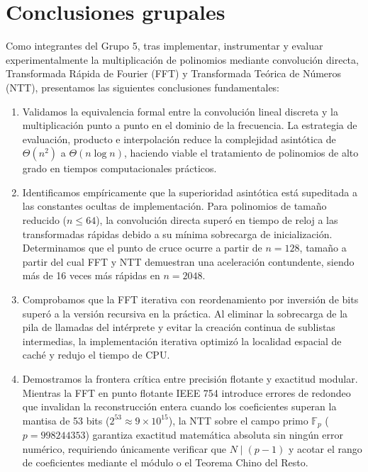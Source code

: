 \section{Conclusiones grupales}

Como integrantes del Grupo 5, tras implementar, instrumentar y evaluar experimentalmente la multiplicación de polinomios mediante convolución directa, Transformada Rápida de Fourier (FFT) y Transformada Teórica de Números (NTT), presentamos las siguientes conclusiones fundamentales:

\begin{enumerate}
    \item Validamos la equivalencia formal entre la convolución lineal discreta y la multiplicación punto a punto en el dominio de la frecuencia. La estrategia de evaluación, producto e interpolación reduce la complejidad asintótica de $\Theta(n^2)$ a $\Theta(n \log n)$, haciendo viable el tratamiento de polinomios de alto grado en tiempos computacionales prácticos.

    \item Identificamos empíricamente que la superioridad asintótica está supeditada a las constantes ocultas de implementación. Para polinomios de tamaño reducido ($n \le 64$), la convolución directa superó en tiempo de reloj a las transformadas rápidas debido a su mínima sobrecarga de inicialización. Determinamos que el punto de cruce ocurre a partir de $n = 128$, tamaño a partir del cual FFT y NTT demuestran una aceleración contundente, siendo más de 16 veces más rápidas en $n = 2048$.

    \item Comprobamos que la FFT iterativa con reordenamiento por inversión de bits superó a la versión recursiva en la práctica. Al eliminar la sobrecarga de la pila de llamadas del intérprete y evitar la creación continua de sublistas intermedias, la implementación iterativa optimizó la localidad espacial de caché y redujo el tiempo de CPU.

    \item Demostramos la frontera crítica entre precisión flotante y exactitud modular. Mientras la FFT en punto flotante IEEE 754 introduce errores de redondeo que invalidan la reconstrucción entera cuando los coeficientes superan la mantisa de 53 bits ($2^{53} \approx 9 \times 10^{15}$), la NTT sobre el campo primo $\mathbb{F}_p$ ($p = 998244353$) garantiza exactitud matemática absoluta sin ningún error numérico, requiriendo únicamente verificar que $N \mid (p-1)$ y acotar el rango de coeficientes mediante el módulo o el Teorema Chino del Resto.
\end{enumerate}
